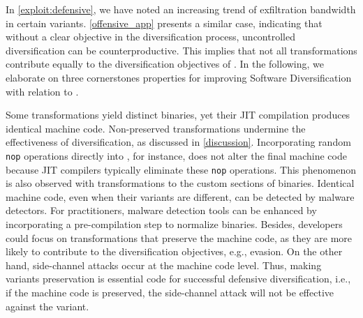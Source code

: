 \label{exploit:discussion}
In \autoref{exploit:defensive}, we have noted an increasing trend of exfiltration bandwidth in certain variants. 
\autoref{offensive_app} presents a similar case, indicating that without a clear objective in the diversification process, uncontrolled diversification can be counterproductive. 
This implies that not all transformations contribute equally to the diversification objectives of \Wasm.
In the following, we elaborate on three cornerstones properties for improving Software Diversification with relation to \Wasm.


\begin{strategy}[Preservation]    
    Some transformations yield distinct \Wasm binaries, yet their JIT compilation produces identical machine code.
    Non-preserved transformations undermine the effectiveness of diversification, as discussed in \autoref{discussion}.
    Incorporating random \texttt{nop} operations directly into \Wasm, for instance, does not alter the final machine code because JIT compilers typically eliminate these \texttt{nop} operations.
    This phenomenon is also observed with transformations to the custom sections of \Wasm binaries.
    Identical machine code, even when their \Wasm variants are different, can be detected by malware detectors.
    For practitioners, malware detection tools can be enhanced by incorporating a pre-compilation step to normalize \Wasm binaries.
    Besides, developers could focus on transformations that preserve the machine code, as they are more likely to contribute to the diversification objectives, e.g., evasion.
    On the other hand, side-channel attacks occur at the machine code level.
    Thus, making \Wasm variants preservation is essential code for successful defensive diversification, i.e., if the machine code is preserved, the side-channel attack will not be effective against the \Wasm variant.    
\end{strategy}



 
